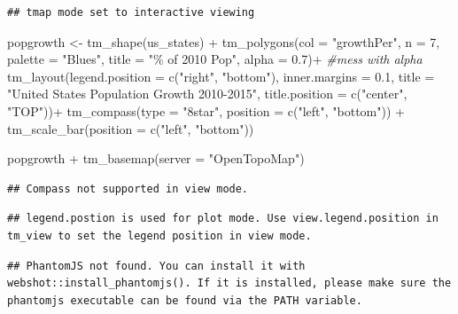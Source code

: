 \documentclass[
]{book}
\newenvironment{Shaded}{\begin{snugshade}}{\end{snugshade}}
\newcommand{\AttributeTok}[1]{\textcolor[rgb]{0.77,0.63,0.00}{#1}}
\newcommand{\CommentTok}[1]{\textcolor[rgb]{0.56,0.35,0.01}{\textit{#1}}}
\newcommand{\DecValTok}[1]{\textcolor[rgb]{0.00,0.00,0.81}{#1}}
\newcommand{\FloatTok}[1]{\textcolor[rgb]{0.00,0.00,0.81}{#1}}
\newcommand{\FunctionTok}[1]{\textcolor[rgb]{0.00,0.00,0.00}{#1}}
\newcommand{\NormalTok}[1]{#1}
\newcommand{\OtherTok}[1]{\textcolor[rgb]{0.56,0.35,0.01}{#1}}
\newcommand{\SpecialCharTok}[1]{\textcolor[rgb]{0.00,0.00,0.00}{#1}}
\newcommand{\StringTok}[1]{\textcolor[rgb]{0.31,0.60,0.02}{#1}}
\begin{document}
\begin{verbatim}
## tmap mode set to interactive viewing
\end{verbatim}

\begin{Shaded}
\begin{Highlighting}[]
\NormalTok{popgrowth }\OtherTok{\textless{}{-}} \FunctionTok{tm\_shape}\NormalTok{(us\_states) }\SpecialCharTok{+} 
  \FunctionTok{tm\_polygons}\NormalTok{(}\AttributeTok{col =} \StringTok{"growthPer"}\NormalTok{, }\AttributeTok{n =} \DecValTok{7}\NormalTok{, }
              \AttributeTok{palette =} \StringTok{"Blues"}\NormalTok{, }\AttributeTok{title =} \StringTok{"\% of 2010 Pop"}\NormalTok{,}
              \AttributeTok{alpha =} \FloatTok{0.7}\NormalTok{)}\SpecialCharTok{+} \CommentTok{\#mess with alpha}
  \FunctionTok{tm\_layout}\NormalTok{(}\AttributeTok{legend.position =} \FunctionTok{c}\NormalTok{(}\StringTok{"right"}\NormalTok{, }\StringTok{"bottom"}\NormalTok{), }
            \AttributeTok{inner.margins =} \FloatTok{0.1}\NormalTok{,}
            \AttributeTok{title =} \StringTok{"United States Population Growth 2010{-}2015"}\NormalTok{, }
            \AttributeTok{title.position =} \FunctionTok{c}\NormalTok{(}\StringTok{"center"}\NormalTok{, }\StringTok{"TOP"}\NormalTok{))}\SpecialCharTok{+}
  \FunctionTok{tm\_compass}\NormalTok{(}\AttributeTok{type =} \StringTok{"8star"}\NormalTok{, }\AttributeTok{position =} \FunctionTok{c}\NormalTok{(}\StringTok{"left"}\NormalTok{, }\StringTok{"bottom"}\NormalTok{)) }\SpecialCharTok{+}
  \FunctionTok{tm\_scale\_bar}\NormalTok{(}\AttributeTok{position =} \FunctionTok{c}\NormalTok{(}\StringTok{"left"}\NormalTok{, }\StringTok{"bottom"}\NormalTok{))}

\NormalTok{popgrowth }\SpecialCharTok{+} \FunctionTok{tm\_basemap}\NormalTok{(}\AttributeTok{server =} \StringTok{"OpenTopoMap"}\NormalTok{)}
\end{Highlighting}
\end{Shaded}

\begin{verbatim}
## Compass not supported in view mode.
\end{verbatim}

\begin{verbatim}
## legend.postion is used for plot mode. Use view.legend.position in tm_view to set the legend position in view mode.
\end{verbatim}

\begin{verbatim}
## PhantomJS not found. You can install it with webshot::install_phantomjs(). If it is installed, please make sure the phantomjs executable can be found via the PATH variable.
\end{verbatim}
\end{document}
